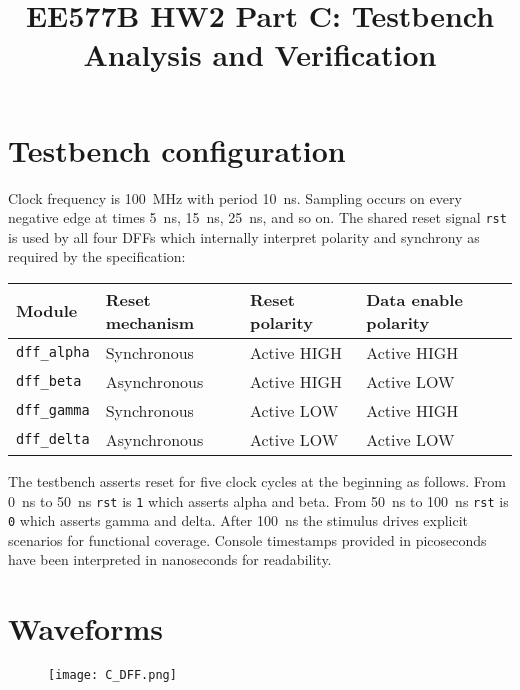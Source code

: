 \documentclass[11pt]{article}
\title{EE577B HW2 Part C: Testbench Analysis and Verification}
\author{}
\date{}
\begin{document}
\maketitle

\vspace{-50pt}
\section*{Testbench configuration}
Clock frequency is \SI{100}{MHz} with period \SI{10}{ns}. Sampling occurs on every negative edge at times \SI{5}{ns}, \SI{15}{ns}, \SI{25}{ns}, and so on. The shared reset signal \texttt{rst} is used by all four DFFs which internally interpret polarity and synchrony as required by the specification:
\begin{center}
\begin{tabular}{@{}llll@{}}
\toprule
Module & Reset mechanism & Reset polarity & Data enable polarity \\
\midrule
\texttt{dff\_alpha} & Synchronous & Active HIGH & Active HIGH \\
\texttt{dff\_beta}  & Asynchronous & Active HIGH & Active LOW \\
\texttt{dff\_gamma} & Synchronous & Active LOW  & Active HIGH \\
\texttt{dff\_delta} & Asynchronous & Active LOW  & Active LOW \\
\bottomrule
\end{tabular}
\end{center}

The testbench asserts reset for five clock cycles at the beginning as follows. From \SI{0}{ns} to \SI{50}{ns} \texttt{rst} is \texttt{1} which asserts alpha and beta. From \SI{50}{ns} to \SI{100}{ns} \texttt{rst} is \texttt{0} which asserts gamma and delta. After \SI{100}{ns} the stimulus drives explicit scenarios for functional coverage. Console timestamps provided in picoseconds have been interpreted in nanoseconds for readability.

\section*{Waveforms}

        \begin{figure}[h!]
            \centering 
            \texttt{[image: C\_DFF.png]}
        \end{figure}
\end{document}
